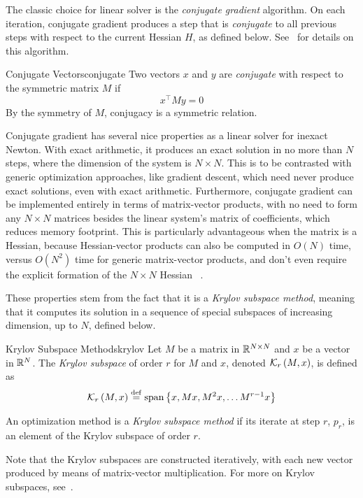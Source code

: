 \documentclass[../../thesis.tex]{subfiles}
\begin{document}
The classic choice for linear solver is the
\emph{conjugate gradient} algorithm.
On each iteration, conjugate gradient
produces a step that is \emph{conjugate}
to all previous steps
with respect to the current Hessian $H$,
as defined below.
See~\cite[Chapter 5]{nocedal2006} for details on this algorithm.
\begin{definition}{Conjugate Vectors}{conjugate}
	Two vectors $x$ and $y$ are \emph{conjugate}
	with respect to the symmetric matrix $M$ if
	\begin{equation}
		x^\top M y = 0
	\end{equation}
	\noindent By the symmetry of $M$,
	conjugacy is a symmetric relation.
\end{definition}
\noindent

Conjugate gradient has several nice properties
as a linear solver for inexact Newton.
With exact arithmetic, it produces an exact solution
in no more than $N$ steps,
where the dimension of the system is $N\times N$.
This is to be contrasted with generic optimization approaches,
like gradient descent,
which need never produce exact solutions,
even with exact arithmetic.
Furthermore, conjugate gradient can be implemented entirely
in terms of matrix-vector products,
with no need to form any $N\times N$ matrices
besides the linear system's matrix of coefficients,
which reduces memory footprint.
This is particularly advantageous when the matrix is a Hessian,
because Hessian-vector products can also be computed in $O(N)$ time,
versus $O(N^2)$ time for generic matrix-vector products,
and don't even require the explicit formation of the $N \times N$ Hessian%
~\cite{pearlmutter1994}.

These properties stem from the fact that it is a
\emph{Krylov subspace method},
meaning that it computes
its solution in a sequence of special subspaces
of increasing dimension, up to $N$,
defined below.
\begin{definition}{Krylov Subspace Methods}{krylov}
	Let $M$ be a matrix in $\mathbb{R}^{N\times N}$
	and $x$ be a vector in $\mathbb{R}^N$.
	The \emph{Krylov subspace}
	of order $r$
	for $M$ and $x$, denoted
	${\mathcal{K}}_r\left(M, x\right)$,
	is defined as
	\begin{equation}
		{\mathcal{K}}_r\left(M, x\right)
		\stackrel{\small \mathrm{def}}{=} \mathrm{span}\left\{x, Mx, M^2x, \dots M^{r-1}x\right\}
	\end{equation}

	An optimization method is a
	\emph{Krylov subspace method}
	if its iterate at step $r$, $p_r$,
	is an element of the Krylov subspace of order $r$.
\end{definition}
\noindent Note that the Krylov subspaces
are constructed iteratively,
with each new vector produced by
means of matrix-vector multiplication.
For more on Krylov subspaces,
see~\cite[Section 5.1]{nocedal2006}.
\end{document}
